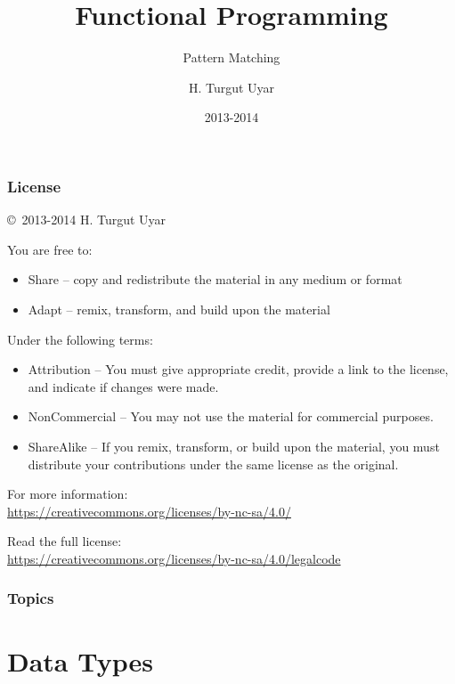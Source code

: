 \documentclass[dvipsnames]{beamer}
\title{Functional Programming}
\subtitle{Pattern Matching}
\author{H. Turgut Uyar}
\date{2013-2014}
\theoremstyle{plain}
\begin{document}

\begin{frame}
  \titlepage
\end{frame}

\begin{frame}
  \frametitle{License}

  \hfill
  \copyright~2013-2014 H. Turgut Uyar

  \vfill
  \begin{footnotesize}
    You are free to:
    \begin{itemize}
      \itemsep0em
      \item Share -- copy and redistribute the material in any medium or format
      \item Adapt -- remix, transform, and build upon the material
    \end{itemize}

    Under the following terms:
    \begin{itemize}
      \itemsep0em
      \item Attribution -- You must give appropriate credit, provide a link to
        the license, and indicate if changes were made.

      \item NonCommercial -- You may not use the material for commercial
        purposes.

      \item ShareAlike -- If you remix, transform, or build upon the material,
        you must distribute your contributions under the same license as the
        original.
    \end{itemize}
  \end{footnotesize}

  \begin{small}
    For more information:\\
    \url{https://creativecommons.org/licenses/by-nc-sa/4.0/}

    \smallskip
    Read the full license:\\
    \url{https://creativecommons.org/licenses/by-nc-sa/4.0/legalcode}
  \end{small}
\end{frame}

\begin{frame}
  \frametitle{Topics}
  \tableofcontents
\end{frame}

\section{Data Types}
\end{document}
